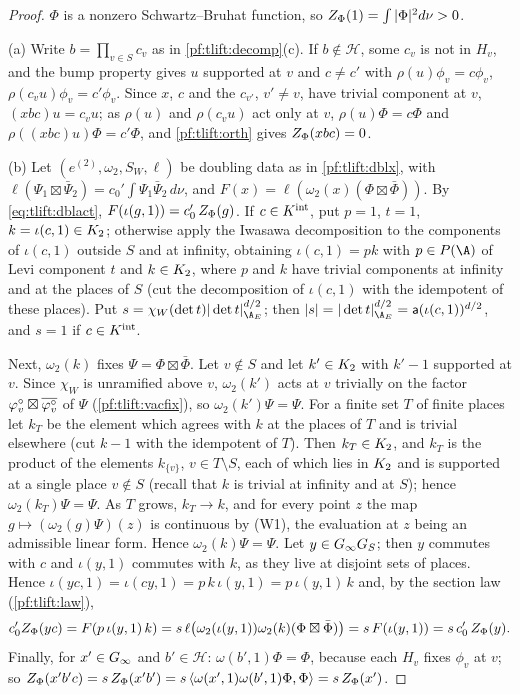 \begin{proof}
$\Phi$ is a nonzero Schwartz--Bruhat function, so $Z_\Phi(1)=\int|\Phi|^2d\nu>0$.

(a) Write $b=\prod_{v\in S}c_v$ as in \cref{pf:tlift:decomp}(c). If $b\notin\mathcal H$, some $c_v$ is not in $H_v$, and the bump
property gives $u$ supported at $v$ and $c\ne c'$ with $\rho(u)\phi_v=c\phi_v$, $\rho(c_vu)\phi_v=c'\phi_v$. Since $x$, $c$ and the
$c_{v'}$, $v'\ne v$, have trivial component at $v$, $(xbc)u=c_vu$; as $\rho(u)$ and $\rho(c_vu)$ act only at $v$,
$\rho(u)\Phi=c\Phi$ and $\rho((xbc)u)\Phi=c'\Phi$, and \cref{pf:tlift:orth} gives $Z_\Phi(xbc)=0$.

(b) Let $(e^{(2)},\omega_2,S_W,\ell)$ be doubling data as in \cref{pf:tlift:dblx}, with $\ell(\Psi_1\boxtimes\bar\Psi_2)=c_0'\int\Psi_1\bar\Psi_2\,d\nu$,
and $F(x)=\ell(\omega_2(x)(\Phi\boxtimes\bar\Phi))$. By \eqref{eq:tlift:dblact},
$F(\iota(g,1))=c_0'\,Z_\Phi(g)$. If $c\in K^{\mathrm{int}}$, put $p=1$, $t=1$, $k=\iota(c,1)\in K_2$; otherwise apply the Iwasawa
decomposition to the components of $\iota(c,1)$ outside $S$ and at infinity, obtaining $\iota(c,1)=pk$ with $p\in P(\A)$
of Levi component $t$ and $k\in K_2$, where $p$ and $k$ have trivial components at infinity and at the places of
$S$ (cut the decomposition of $\iota(c,1)$ with the idempotent of these places). Put $s=\chi_W(\det t)|\det t|_{\tliftAE}^{d/2}$; then
$|s|=|\det t|^{d/2}_{\tliftAE}=\tliftht(\iota(c,1))^{d/2}$, and $s=1$ if $c\in K^{\mathrm{int}}$.

Next, $\omega_2(k)$ fixes $\Psi=\Phi\boxtimes\bar\Phi$. Let $v\notin S$ and let $k'\in K_2$ with $k'-1$ supported at $v$.
Since $\chi_W$ is unramified above $v$, $\omega_2(k')$ acts at $v$ trivially on the factor
$\varphi^{\circ}_v\boxtimes\overline{\varphi^{\circ}_v}$ of $\Psi$ (\cref{pf:tlift:vacfix}), so $\omega_2(k')\Psi=\Psi$. For a finite set $T$ of
finite places let $k_T$ be the element which agrees with $k$ at the places of $T$ and is trivial elsewhere (cut
$k-1$ with the idempotent of $T$). Then $k_T\in K_2$, and $k_T$ is the product of the elements $k_{\{v\}}$,
$v\in T\setminus S$, each of which lies in $K_2$ and is supported at a single place $v\notin S$ (recall that $k$ is
trivial at infinity and at $S$); hence $\omega_2(k_T)\Psi=\Psi$. As $T$ grows, $k_T\to k$, and for every point $z$ the map
$g\mapsto(\omega_2(g)\Psi)(z)$ is continuous by (W1), the evaluation at $z$ being an admissible linear form.
Hence $\omega_2(k)\Psi=\Psi$. Let $y\in G_\infty G_S$; then $y$ commutes with $c$ and $\iota(y,1)$
commutes with $k$, as they live at disjoint sets of places. Hence $\iota(yc,1)=\iota(cy,1)=p\,k\,\iota(y,1)=p\,\iota(y,1)\,k$ and, by
the section law (\cref{pf:tlift:law}),
\[
  c_0'Z_\Phi(yc)=F(p\,\iota(y,1)\,k)=s\,\ell\bigl(\omega_2(\iota(y,1))\omega_2(k)(\Phi\boxtimes\bar\Phi)\bigr)=s\,F(\iota(y,1))=s\,c_0'\,Z_\Phi(y).
\]
Finally, for $x'\in G_\infty$ and $b'\in\mathcal H$: $\omega(b',1)\Phi=\Phi$, because each $H_v$ fixes $\phi_v$ at $v$; so
$Z_\Phi(x'b'c)=s\,Z_\Phi(x'b')=s\,\langle\omega(x',1)\omega(b',1)\Phi,\Phi\rangle=s\,Z_\Phi(x')$.
\end{proof}

